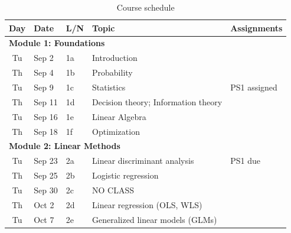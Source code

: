 \documentclass[11pt,twoside]{article}
\numberwithin{equation}{section}
\newcommand{\?}{\stackrel{?}{=}}
\begin{document}



\begin{table}[h!]\small
\centering
\caption{Course schedule}
\label{tab:compsyl}
\begin{tabular}{cllll}
\toprule
\bf Day & \bf  Date & \bf L/N & \bf Topic                                             &\bf Assignments    \\%
\midrule
\multicolumn{4}{l}{\bf Module 1: Foundations}                                                     \\
\midrule  
Tu       & Sep 2     & 1a      & Introduction                                        &                   \\ 
Th       & Sep 4     & 1b      & Probability                                           &                                \\ 
Tu       & Sep 9     & 1c      & Statistics                                            &    PS1 assigned                            \\
Th       & Sep 11    & 1d      & Decision theory; Information theory                   &                                \\
Tu       & Sep 16    & 1e      & Linear Algebra                                        &                                \\
Th       & Sep 18    & 1f      & Optimization                                          &          \\
\midrule
\multicolumn{4}{l}{\bf Module 2: Linear Methods}                                \\
\midrule
Tu       & Sep 23    & 2a      & Linear discriminant analysis                          & PS1 due           \\
Th       & Sep 25    & 2b      & Logistic regression                                   &                                \\
Tu       & Sep 30    & 2c      & NO CLASS                          &                     \\ 
Th       & Oct 2     & 2d      & Linear regression (OLS, WLS)                           &                                \\ 
Tu       & Oct 7     & 2e      & Generalized linear models (GLMs)        &                                \\

\end{tabular}
\end{table}
\end{document}

